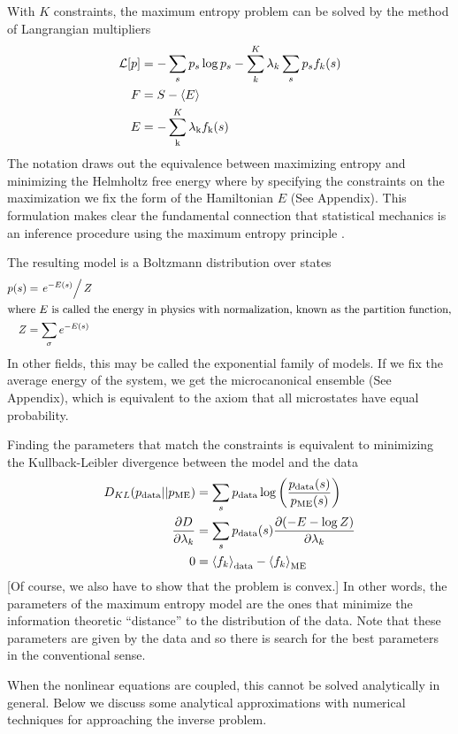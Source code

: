 \documentclass[aps,prl,twocolumn]{revtex4-1}
\begin{document}
With $K$ constraints, the maximum entropy problem can be solved by the method of Langrangian multipliers
\begin{align}
	\mathcal{L}[p] &= -\sum_s p_s\log p_s - \sum_k^K \lambda_k \sum_s p_s f_k(s)\\
	F &= S - \left<E\right>\\
	E &= -\sum_{\rm k}^K\lambda_{\rm k}f_{\rm k}(s)
\end{align}
The notation draws out the equivalence between maximizing entropy and minimizing the Helmholtz free energy where by specifying the constraints on the maximization we fix the form of the Hamiltonian $E$ (See Appendix). This formulation makes clear the fundamental connection that statistical mechanics is an inference procedure using the maximum entropy principle \cite{Jaynes:1957fy}.

The resulting model is a Boltzmann distribution over states
\begin{align}
	p(s) &= \left.e^{-E(s)}\right/Z\\
\intertext{where $E$ is called the energy in physics with normalization, known as the partition function,}
	Z &= \sum_\sigma e^{-E(s)}
\end{align}
In other fields, this may be called the exponential family of models. If we fix the average energy of the system, we get the microcanonical ensemble (See Appendix), which is equivalent to the axiom that all microstates have equal probability.

Finding the parameters that match the constraints is equivalent to minimizing the Kullback-Leibler divergence between the model and the data \cite{Cover:2006tl}
\begin{align}
	D_{KL}(p_{\rm data}||p_{\rm ME}) &= \sum_s p_{\rm data} \log\left(\frac{p_{\rm data}(s)}{p_{\rm ME}(s)}\right)\\
	\frac{\partial D}{\partial \lambda_k} &= \sum_s p_{\rm data}(s) \frac{\partial (-E-\log Z)}{\partial \lambda_k}\label{eq:dkl deriv}\\
	0 &= \left<f_k\right>_{\rm data} -\left<f_k\right>_{\rm ME}\label{eq:fk-fk}
\end{align}
[Of course, we also have to show that the problem is convex.] In other words, the parameters of the maximum entropy model are the ones that minimize the information theoretic ``distance'' to the distribution of the data. Note that these parameters are given by the data and so there is search for the best parameters in the conventional sense.

When the nonlinear equations are coupled, this cannot be solved analytically in general. Below we discuss some analytical approximations with numerical techniques for approaching the inverse problem.
\end{document}

